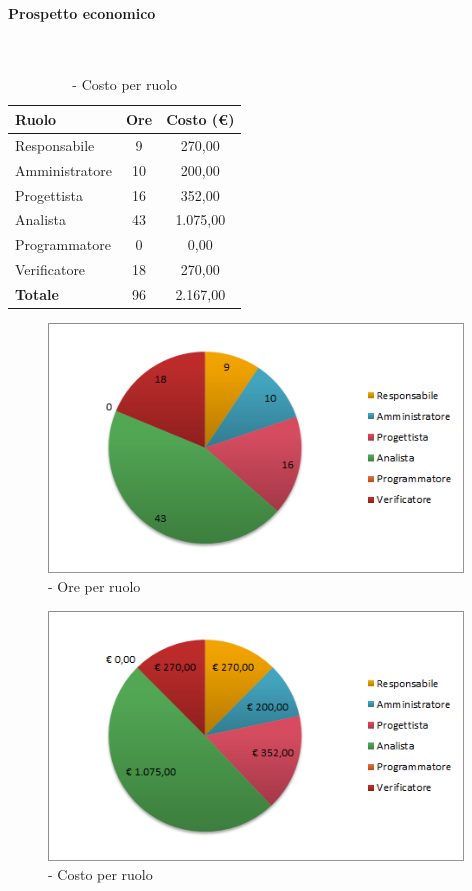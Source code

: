 \documentclass[../PianoDiProgetto.tex]{subfiles}
\begin{document}
	\paragraph{Prospetto economico}\
					
	\begin{table}[H]
		\centering
	
		\begin{tabular}{l * {2}{c}}
			\toprule
			\textbf{Ruolo} & \textbf{Ore} & \textbf{Costo (\euro{})} \\
			\midrule
			Responsabile & 9    &  270,00 \\
			Amministratore  & 10     &  200,00 \\
			Progettista  & 16    &  352,00 \\
			Analista & 43   &  1.075,00 \\
			Programmatore  & 0    &  0,00 \\
			Verificatore  & 18    &  270,00 \\
			\midrule
			\textbf{Totale}  & 96   &  2.167,00 \\
			\bottomrule		
		\end{tabular}
		\caption{\PerPD{} - Costo per ruolo}
		
	\end{table}
\vfill	
\newpage
\vfill
	
	\begin{figure}[H]
		\centering
		\includegraphics[width=11cm, trim=1cm 0cm 1cm 0cm]{grafici/PD-ruolo}
			\caption{\PerPD{}- Ore per ruolo}
		
	\end{figure}

\vfill	
	\begin{figure}[H]
		\centering
		\includegraphics[width=11cm, trim=1cm 0cm 1cm 0cm]{grafici/PD-costo}
			\caption{\PerPD{} - Costo per ruolo}
	\end{figure}
\vfill	
\newpage	
	
\end{document}
